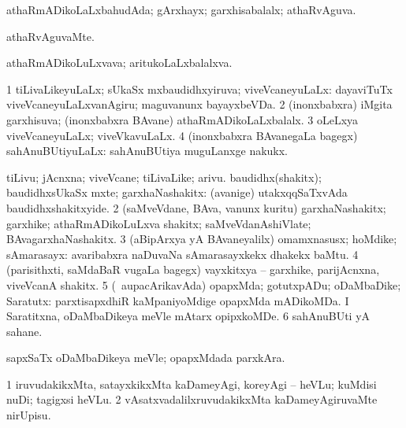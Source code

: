 \bentry
{} 
\gl{\gu}
\expl{}
\bmng
 athaRmADikoLaLxbahudAda; gArxhayx; garxhisabalalx; athaRvAguva. 
\emng
\eentry

\bentry
{} 
\gl{\kirxvi}
\expl{}
\bmng
athaRvAguvaMte. 
\emng
\eentry

\bentry
{} 
\gl{\nA}
\expl{}
\bmng
 athaRmADikoLuLxvava; aritukoLaLxbalalxva. 
\emng
\eentry

\bentry
{} 
\gl{\gu}
\expl{}
\bmng
\bnum
\num{1} tiLivaLikeyuLaLx; sUkaSx mxbaudidhxyiruva; viveVcaneyuLaLx:  dayaviTuTx viveVcaneyuLaLxvanAgiru; maguvanunx bayayxbeVDa. 
\num{2} (inonxbabxra) iMgita garxhisuva; (inonxbabxra BAvane) athaRmADikoLaLxbalalx. 
\num{3} oLeLxya viveVcaneyuLaLx; viveVkavuLaLx. 
\num{4} (inonxbabxra BAvanegaLa bagegx) sahAnuBUtiyuLaLx:  sahAnuBUtiya muguLanxge nakukx. 
\enum
\emng
\eentry

\bentry
{} 
\gl{\nA}
\expl{}
\bmng
\bnum
{} 
\banum
{} tiLivu; jAcnxna; viveVcane; tiLivaLike; arivu. 
 baudidhx(shakitx); baudidhxsUkaSx mxte; garxhaNashakitx:  (avanige) utakxqqSaTxvAda baudidhxshakitxyide. 
\eanum
\numie
\num{2} (saMveVdane, BAva, \mo vanunx kuritu) garxhaNashakitx; garxhike; athaRmADikoLuLxva shakitx; saMveVdanAshiVlate; BAvagarxhaNashakitx. 
\num{3} (aBipArxya yA BAvaneyalilx) omamxnasusx; hoMdike; sAmarasayx:  avaribabxra naDuvaNa sAmarasayxkekx dhakekx baMtu. 
\num{4} (parisithxti, saMdaBaR \mo vugaLa bagegx) vayxkitxya -- garxhike, parijAcnxna, viveVcanA shakitx. 
\num{5} (\kanmu\ aupacArikavAda) opapxMda; gotutxpADu; oDaMbaDike; Saratutx:  parxtisapxdhiR kaMpaniyoMdige opapxMda mADikoMDa.  I Saratitxna, oDaMbaDikeya meVle mAtarx opipxkoMDe. 
\num{6} sahAnuBUti yA sahane. 
\enum
\emng

\noindent
\gl{\pagu}
\expl{}
\bmng
  sapxSaTx oDaMbaDikeya meVle; opapxMdada parxkAra. 
\emng
\eentry

\bentry
{} 
\gl{\sakirx}
\expl{}
\bmng
\bnum
\num{1} iruvudakikxMta, satayxkikxMta kaDameyAgi, koreyAgi -- heVLu; kuMdisi nuDi; tagigxsi heVLu. 
\num{2} vAsatxvadalilxruvudakikxMta kaDameyAgiruvaMte nirUpisu. 
\enum
\emng
\eentry

